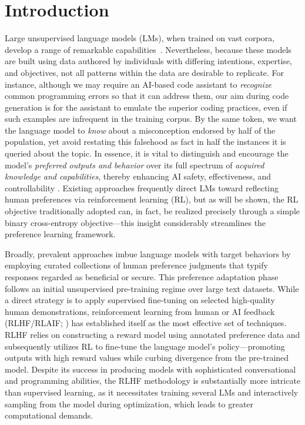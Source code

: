 \section{Introduction}
Large unsupervised language models (LMs), when trained on vast corpora, develop a range of remarkable capabilities~\citep{chowdhery2022palm, brown2020language, touvron2023llama,bubeck2023sparks}. Nevertheless, because these models are built using data authored by individuals with differing intentions, expertise, and objectives, not all patterns within the data are desirable to replicate. For instance, although we may require an AI-based code assistant to \textit{recognize} common programming errors so that it can address them, our aim during code generation is for the assistant to emulate the superior coding practices, even if such examples are infrequent in the training corpus. By the same token, we want the language model to \textit{know} about a misconception endorsed by half of the population, yet avoid restating this falsehood as fact in half the instances it is queried about the topic. In essence, it is vital to distinguish and encourage the model's \emph{preferred outputs and behavior} over its full spectrum of \textit{acquired knowledge and capabilities}, thereby enhancing AI safety, effectiveness, and controllability \citep{ouyang2022training}. Existing approaches frequently direct LMs toward reflecting human preferences via reinforcement learning (RL), but as will be shown, the RL objective traditionally adopted can, in fact, be realized precisely through a simple binary cross-entropy objective—this insight considerably streamlines the preference learning framework.

Broadly, prevalent approaches imbue language models with target behaviors by employing curated collections of human preference judgments that typify responses regarded as beneficial or secure. This preference adaptation phase follows an initial unsupervised pre-training regime over large text datasets. While a direct strategy is to apply supervised fine-tuning on selected high-quality human demonstrations, reinforcement learning from human or AI feedback (RLHF/RLAIF; \citep{christiano2017deep,bai2022constitutional}) has established itself as the most effective set of techniques. RLHF relies on constructing a reward model using annotated preference data and subsequently utilizes RL to fine-tune the language model's policy—promoting outputs with high reward values while curbing divergence from the pre-trained model. Despite its success in producing models with sophisticated conversational and programming abilities, the RLHF methodology is substantially more intricate than supervised learning, as it necessitates training several LMs and interactively sampling from the model during optimization, which leads to greater computational demands.

